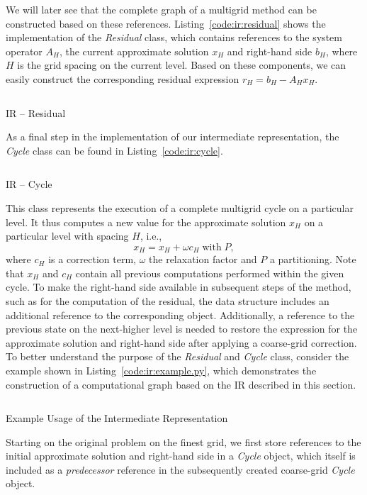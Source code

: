 We will later see that the complete graph of a multigrid method can be constructed based on these references.
Listing~\ref{code:ir:residual} shows the implementation of the \emph{Residual} class, which contains references to the system operator $A_H$, the current approximate solution $x_H$ and right-hand side $b_H$, where $H$ is the grid spacing on the current level.
Based on these components, we can easily construct the corresponding residual expression $r_H = b_H - A_H x_H$.
\begin{listing}
	\inputminted{python}{evostencils/ir/residual.py}
	\caption{IR -- Residual}
	\label{code:ir:residual}
\end{listing}
As a final step in the implementation of our intermediate representation, the \emph{Cycle} class can be found in Listing~\ref{code:ir:cycle}.
\begin{listing}
	\inputminted{python}{evostencils/ir/cycle.py}
	\caption{IR -- Cycle}
	\label{code:ir:cycle}
\end{listing}
This class represents the execution of a complete multigrid cycle on a particular level.
It thus computes a new value for the approximate solution $x_H$ on a particular level with spacing $H$, i.e.,
\begin{equation*}
	x_H = x_H + \omega c_H \; \text{with} \; P,
\end{equation*}
where $c_H$ is a correction term, $\omega$ the relaxation factor and $P$ a partitioning.
Note that $x_H$ and $c_H$ contain all previous computations performed within the given cycle.
To make the right-hand side available in subsequent steps of the method, such as for the computation of the residual, the data structure includes an additional reference to the corresponding object.
Additionally, a reference to the previous state on the next-higher level is needed to restore the expression for the approximate solution and right-hand side after applying a coarse-grid correction.
To better understand the purpose of the \emph{Residual} and \emph{Cycle} class, consider the example shown in Listing~\ref{code:ir:example.py}, which demonstrates the construction of a computational graph based on the IR described in this section.
\begin{listing}
	\inputminted{python}{evostencils/ir/example.py}
	\caption{Example Usage of the Intermediate Representation}
	\label{code:ir:example.py}
\end{listing}
Starting on the original problem on the finest grid, we first store references to the initial approximate solution and right-hand side in a \emph{Cycle} object, which itself is included as a \emph{predecessor} reference in the subsequently created coarse-grid \emph{Cycle} object.

